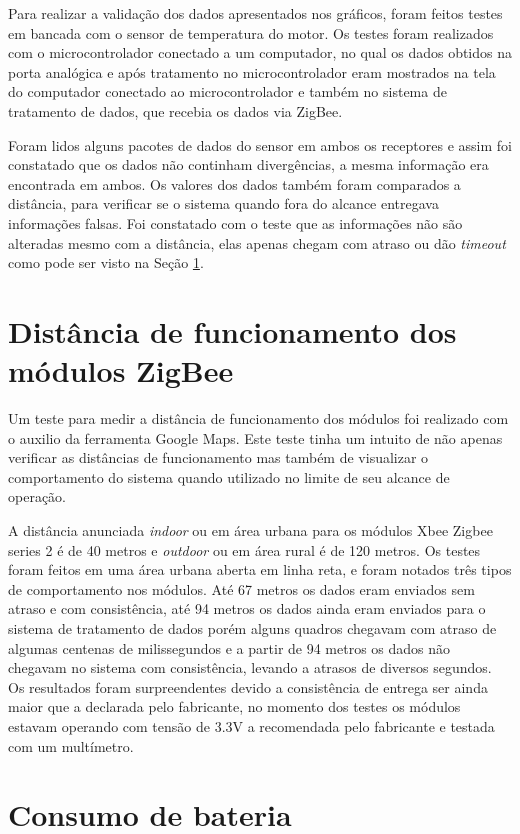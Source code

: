 Para realizar a validação dos dados apresentados nos gráficos, foram feitos testes em bancada com o sensor de temperatura do motor. Os testes foram realizados com o microcontrolador conectado a um computador, no qual os dados obtidos na porta analógica e após tratamento no microcontrolador eram mostrados na tela do computador conectado ao microcontrolador e também no sistema de tratamento de dados, que recebia os dados via ZigBee. 

Foram lidos alguns pacotes de dados do sensor em ambos os receptores e assim foi constatado que os dados não continham divergências, a mesma informação era encontrada em ambos. Os valores dos dados também foram comparados a distância, para verificar se o sistema quando fora do alcance entregava informações falsas. Foi constatado com o teste que as informações não são alteradas mesmo com a distância, elas apenas chegam com atraso ou dão \textit{timeout} como pode ser visto na Seção \ref{sec:distancia}.

\section{Distância de funcionamento dos módulos ZigBee}
\label{sec:distancia}

Um teste para medir a distância de funcionamento dos módulos foi realizado com o auxilio da ferramenta Google Maps. Este teste tinha um intuito de não apenas verificar as distâncias de funcionamento mas também de visualizar o comportamento do sistema quando utilizado no limite de seu alcance de operação. 

A distância anunciada \cite{xbeeuserguide} \textit{indoor} ou em área urbana para os módulos Xbee Zigbee series 2 é de 40 metros e \textit{outdoor} ou em área rural é de 120 metros. Os testes foram feitos em uma área urbana aberta em linha reta, e foram notados três tipos de comportamento nos módulos. Até 67 metros os dados eram enviados sem atraso e com consistência, até 94 metros os dados ainda eram enviados para o sistema de tratamento de dados porém alguns quadros chegavam com atraso de algumas centenas de milissegundos e a partir de 94 metros os dados não chegavam no sistema com consistência, levando a atrasos de diversos segundos. Os resultados foram surpreendentes devido a consistência de entrega ser ainda maior que a declarada pelo fabricante, no momento dos testes os módulos estavam operando com tensão de 3.3V a recomendada pelo fabricante e testada com um multímetro. 

\section{Consumo de bateria}

